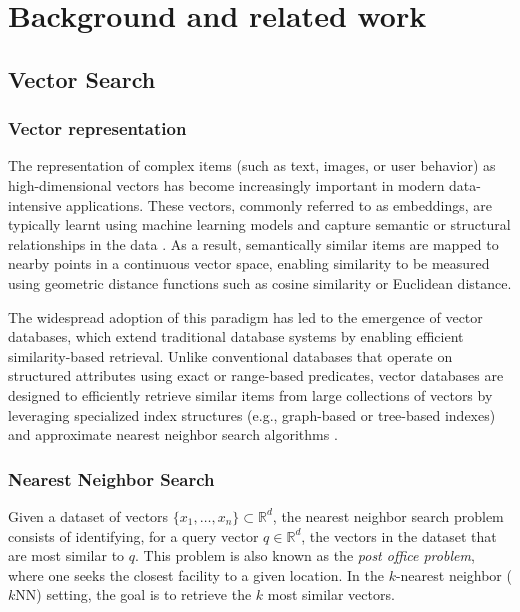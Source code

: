 \chapter{Background and related work}

\section{Vector Search}\label{sec:vector-search}

\subsection{Vector representation}

The representation of complex items (such as text, images, or user behavior) as high-dimensional vectors has become increasingly important in modern data-intensive applications. These vectors, commonly referred to as embeddings, are typically learnt using machine learning models and capture semantic or structural relationships in the data \cite{almeida2023wordembeddingssurvey}. As a result, semantically similar items are mapped to nearby points in a continuous vector space, enabling similarity to be measured using geometric distance functions such as cosine similarity or Euclidean distance.

The widespread adoption of this paradigm has led to the emergence of vector databases, which extend traditional database systems by enabling efficient similarity-based retrieval. Unlike conventional databases that operate on structured attributes using exact or range-based predicates, vector databases are designed to efficiently retrieve similar items from large collections of vectors by leveraging specialized index structures (e.g., graph-based or tree-based indexes) and approximate nearest neighbor search algorithms \cite{ma2026comprehensivesurveyvectordatabase}.

\subsection{Nearest Neighbor Search}

Given a dataset of vectors $\{x_1, \dots, x_n\} \subset \mathbb{R}^d$, the nearest neighbor search problem consists of identifying, for a query vector $q \in \mathbb{R}^d$, the vectors in the dataset that are most similar to $q$. This problem is also known as the \textit{post office problem}, where one seeks the closest facility to a given location. In the $k$-nearest neighbor ($k$NN) setting, the goal is to retrieve the $k$ most similar vectors. 

